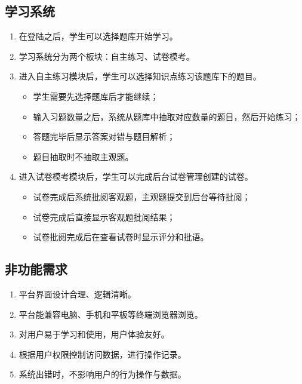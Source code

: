 \documentclass{article}
\begin{document}
    \subsection{学习系统}
    	\begin{enumerate}
    		\item 在登陆之后，学生可以选择题库开始学习。
    		\item 学习系统分为两个板块：自主练习、试卷模考。
    		\item 进入自主练习模块后，学生可以选择知识点练习该题库下的题目。
    		\begin{itemize}
    			\item 学生需要先选择题库后才能继续；
    			\item 输入习题数量之后，系统从题库中抽取对应数量的题目，然后开始练习；
    			\item 答题完毕后显示答案对错与题目解析；
    			\item 题目抽取时不抽取主观题。
    		\end{itemize}
   			\item 进入试卷模考模块后，学生可以完成后台试卷管理创建的试卷。
   			\begin{itemize}
   				\item 试卷完成后系统批阅客观题，主观题提交到后台等待批阅；
   				\item 试卷完成后直接显示客观题批阅结果；
   				\item 试卷批阅完成后在查看试卷时显示评分和批语。
   			\end{itemize}
    	\end{enumerate}
    \subsection{非功能需求}
		\begin{enumerate}
			\item 平台界面设计合理、逻辑清晰。
			\item 平台能兼容电脑、手机和平板等终端浏览器浏览。
			\item 对用户易于学习和使用，用户体验友好。
			\item 根据用户权限控制访问数据，进行操作记录。
			\item 系统出错时，不影响用户的行为操作与数据。
		\end{enumerate}
\end{document}

